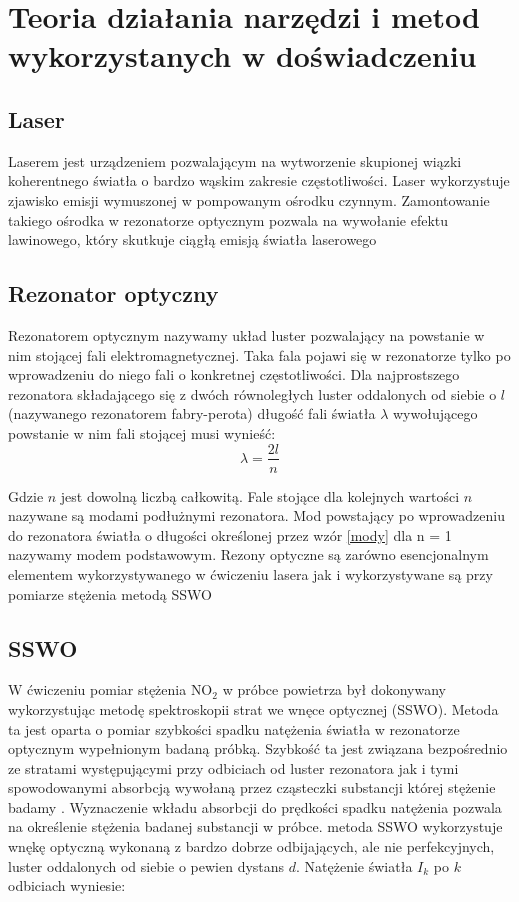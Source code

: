 \documentclass[10pt,a4paper]{article}
\begin{document}
\section{Teoria działania narzędzi i metod wykorzystanych w doświadczeniu}

\subsection*{Laser}
Laserem jest urządzeniem pozwalającym na wytworzenie skupionej wiązki koherentnego światła o bardzo wąskim zakresie częstotliwości. Laser wykorzystuje zjawisko emisji wymuszonej w pompowanym ośrodku czynnym. Zamontowanie takiego ośrodka w rezonatorze optycznym pozwala na wywołanie efektu lawinowego, który skutkuje ciągłą emisją światła laserowego \cite{lasery}

\subsection*{Rezonator optyczny}
Rezonatorem optycznym nazywamy układ luster pozwalający na powstanie w nim stojącej fali elektromagnetycznej.  Taka fala pojawi się w rezonatorze tylko po wprowadzeniu do niego fali o konkretnej częstotliwości. Dla najprostszego rezonatora składającego się z dwóch równoległych luster oddalonych od siebie o $l$ (nazywanego  rezonatorem fabry-perota) długość fali światła  $\lambda$ wywołującego powstanie w nim fali stojącej musi wynieść:
\begin{equation}
    \label{mody}
    \lambda = \frac{2l}{n}
\end{equation}

Gdzie $n$ jest dowolną liczbą całkowitą.
Fale stojące dla kolejnych wartości $n$ nazywane są modami podłużnymi rezonatora. Mod powstający po wprowadzeniu do rezonatora światła o długości określonej przez wzór \ref{mody} dla n = 1 nazywamy modem podstawowym. Rezony optyczne są zarówno esencjonalnym elementem wykorzystywanego w ćwiczeniu lasera jak i  wykorzystywane są przy pomiarze stężenia metodą SSWO

\subsection*{SSWO}
\label{sswow}
W ćwiczeniu pomiar stężenia $\text{NO}_{\text{2}}$ w próbce powietrza był dokonywany wykorzystując metodę spektroskopii strat we wnęce optycznej (SSWO).  Metoda ta jest oparta o pomiar szybkości spadku natężenia światła w rezonatorze optycznym wypełnionym badaną próbką.  Szybkość ta jest związana bezpośrednio ze stratami występującymi przy odbiciach od luster rezonatora jak i tymi spowodowanymi absorbcją wywołaną przez cząsteczki substancji której stężenie badamy\cite{sswo} . Wyznaczenie wkładu absorbcji do prędkości spadku natężenia pozwala na określenie stężenia badanej substancji w próbce.
metoda SSWO wykorzystuje wnękę optyczną wykonaną z bardzo dobrze odbijających, ale nie perfekcyjnych, luster oddalonych od siebie o pewien dystans $d$. Natężenie światła $I_k$ po $k$ odbiciach wyniesie:
\end{document}
